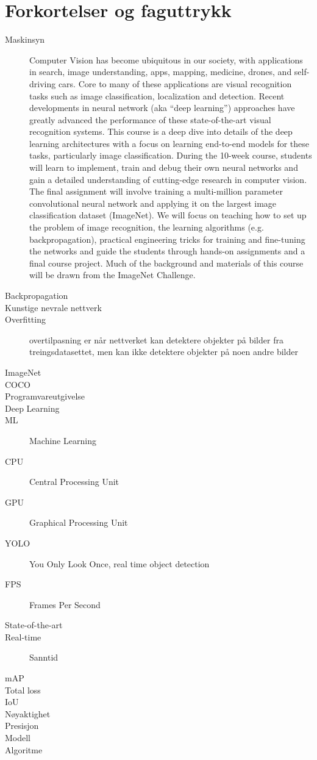 \section*{Forkortelser og faguttrykk}

\begin{description}

\item[Maskinsyn] Computer Vision has become ubiquitous in our society, with applications in search, image understanding, apps, mapping, medicine, drones, and self-driving cars. Core to many of these applications are visual recognition tasks such as image classification, localization and detection. Recent developments in neural network (aka “deep learning”) approaches have greatly advanced the performance of these state-of-the-art visual recognition systems. This course is a deep dive into details of the deep learning architectures with a focus on learning end-to-end models for these tasks, particularly image classification. During the 10-week course, students will learn to implement, train and debug their own neural networks and gain a detailed understanding of cutting-edge research in computer vision. The final assignment will involve training a multi-million parameter convolutional neural network and applying it on the largest image classification dataset (ImageNet). We will focus on teaching how to set up the problem of image recognition, the learning algorithms (e.g. backpropagation), practical engineering tricks for training and fine-tuning the networks and guide the students through hands-on assignments and a final course project. Much of the background and materials of this course will be drawn from the ImageNet Challenge.
\item[Backpropagation]
\item[Kunstige nevrale nettverk]
\item[Overfitting] overtilpasning er når nettverket kan detektere objekter på bilder fra treingsdatasettet, men kan ikke detektere objekter på noen andre bilder
\item[ImageNet]
\item[COCO]
\item[Programvareutgivelse]
\item[Deep Learning]
\item[ML] Machine Learning
\item[CPU] Central Processing Unit
\item[GPU] Graphical Processing Unit
\item[YOLO] You Only Look Once, real time object detection
\item[FPS] Frames Per Second
\item[State-of-the-art] 
\item[Real-time] Sanntid
\item[mAP] 
\item[Total loss]
\item[IoU] 
\item[Nøyaktighet] 
\item[Presisjon] 
\item[Modell] 
\item[Algoritme]


\end{description}